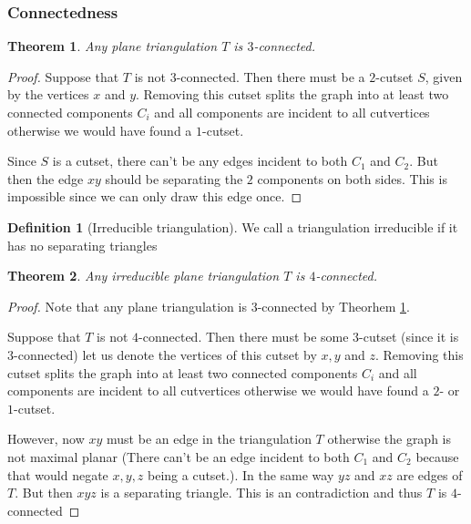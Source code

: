 \documentclass[a4paper]{article}
\newtheorem{thrm}{Theorem}
\theoremstyle{definition}
\newtheorem*{defi}{Definition}
\begin{document}
\subsubsection{Connectedness}
\begin{thrm}
Any plane triangulation $T$ is $3$-connected.
\label{th:plTri3Connected}
\end{thrm}

\begin{proof}
Suppose that $T$ is not $3$-connected. Then there must be a $2$-cutset $S$, given by the vertices $x$ and $y$. Removing this cutset splits the graph into at least two connected components $C_i$ and all components are incident to all cutvertices otherwise we would have found a $1$-cutset.

Since $S$ is a cutset, there can't be any edges incident to both $C_1$ and $C_2$. But then the edge $xy$ should be separating the $2$ components on both sides. This is impossible since we can only draw this edge once. %
\end{proof}

\begin{defi}[Irreducible triangulation]
We call a triangulation irreducible if it has no separating triangles
\end{defi}


\begin{thrm}
Any irreducible plane triangulation $T$ is $4$-connected.
\end{thrm}

\begin{proof}
Note that any plane triangulation is $3$-connected by Theorhem \ref{th:plTri3Connected}.

Suppose that $T$ is not $4$-connected. Then there must be some $3$-cutset (since it is $3$-connected) let us denote the vertices of this cutset by $x, y$ and $z$. Removing this cutset splits the graph into at least two connected components $C_i$ and all components are incident to all cutvertices otherwise we would have found a $2$- or $1$-cutset.  

However, now $xy$ must be an edge in the triangulation $T$ otherwise the graph is not maximal planar (There can't be an edge incident to both $C_1$ and $C_2$ because that would negate $x, y ,z$ being a cutset.). In the same way $yz$ and $xz$ are edges of $T$. But then $xyz$ is a separating triangle. This is an contradiction and thus $T$ is $4$-connected
\end{proof}
\end{document}
